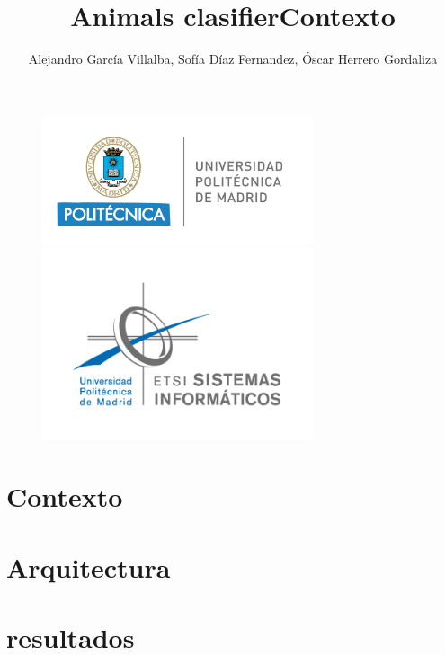 \documentclass{article}
\title{Animals clasifier}
\author{Alejandro García Villalba, Sofía Díaz Fernandez, Óscar Herrero Gordaliza}
\begin{document}
    \maketitle
    \begin{figure}
        \centering
        \includegraphics[width=8cm]{politecnica_logo.png}
        \includegraphics[width=8cm]{etsisi_logo.png}       
    \end{figure}

    \newpage

    \tableofcontents
        \section{Contexto}
        \section{Arquitectura}
        \section{resultados}

    \newpage

    \title{Contexto}\\
\end{document}

